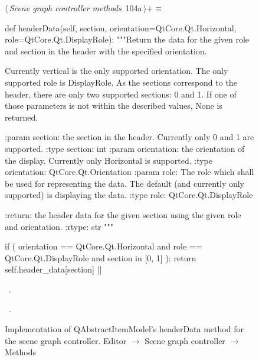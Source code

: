 \documentclass[%
    a4paper,    %
    justified,  %
    nobib,      %
    openany     %
]{tufte-book}
\makeatletter
\renewcommand{\label}[1]{\@tufte@label{##1}}%
\makeatother
\begin{document}
\begin{figure}[!htbp]
\begin{flushleft} \small
\begin{minipage}{\linewidth}\label{scrap35}\raggedright\small
{} $\langle\,${\itshape Scene graph controller methods}\nobreak\ {\footnotesize {104a}}$\,\rangle+\equiv$
\vspace{-1ex}
\begin{pythoncode}
def headerData(self, section, orientation=QtCore.Qt.Horizontal,
               role=QtCore.Qt.DisplayRole):
    """Return the data for the given role and section in the
    header with the specified orientation.

    Currently vertical is the only supported orientation. The
    only supported role is DisplayRole. As the sections correspond
    to the header, there are only two supported sections: 0 and 1.
    If one of those parameters is not within the described values,
    None is returned.

    :param section: the section in the header. Currently only 0
                    and 1 are supported.
    :type  section: int
    :param orientation: the orientation of the display. Currently
                        only Horizontal is supported.
    :type orientation:  QtCore.Qt.Orientation
    :param role: The role which shall be used for representing
                 the data. The default (and currently only
                supported) is displaying the data.
    :type role:  QtCore.Qt.DisplayRole

    :return: the header data for the given section using the
             given role and orientation.
    :rtype:  str
    """

    if (
            orientation == QtCore.Qt.Horizontal  and
            role        == QtCore.Qt.DisplayRole and
            section     in [0, 1]
    ):
        return self.header_data[section]
|\NWsep|
\end{pythoncode}
\vspace{1.5ex}
\footnotesize
\begin{list}{}{\setlength{\itemsep}{-\parsep}\setlength{\itemindent}{-\leftmargin}}
\item \NWtxtMacroDefBy\ .
\item \NWtxtMacroRefIn\ .

\item{}
\end{list}
\end{minipage}\vspace{4ex}
\end{flushleft}
\caption{Implementation of QAbstractItemModel's headerData method for the scene
  graph controller.
  \newline{}\newline{}Editor $\rightarrow$ Scene graph controller $\rightarrow$
  Methods}
\end{figure}
\end{document}
